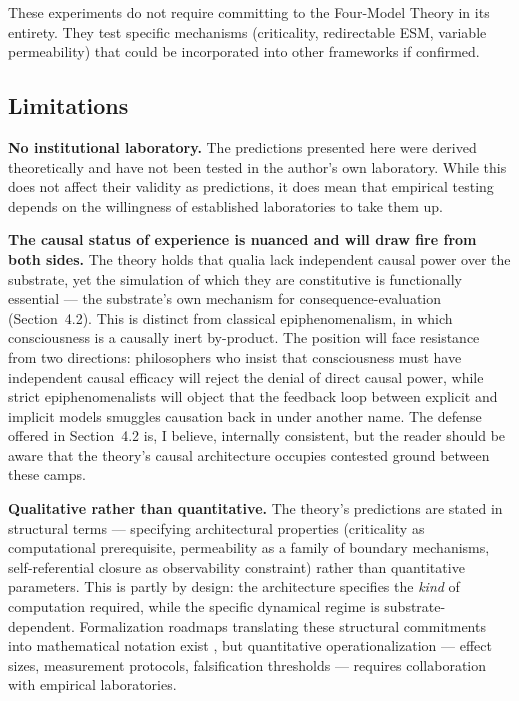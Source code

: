 \documentclass[12pt]{article}
\begin{document}
These experiments do not require committing to the Four-Model Theory in its entirety. They test specific mechanisms (criticality, redirectable ESM, variable permeability) that could be incorporated into other frameworks if confirmed.


\subsection{Limitations}


\textbf{No institutional laboratory.} The predictions presented here were derived theoretically and have not been tested in the author's own laboratory. While this does not affect their validity as predictions, it does mean that empirical testing depends on the willingness of established laboratories to take them up.

\textbf{The causal status of experience is nuanced and will draw fire from both sides.} The theory holds that qualia lack independent causal power over the substrate, yet the simulation of which they are constitutive is functionally essential --- the substrate's own mechanism for consequence-evaluation (Section~4.2). This is distinct from classical epiphenomenalism, in which consciousness is a causally inert by-product. The position will face resistance from two directions: philosophers who insist that consciousness must have independent causal efficacy will reject the denial of direct causal power, while strict epiphenomenalists will object that the feedback loop between explicit and implicit models smuggles causation back in under another name. The defense offered in Section~4.2 is, I believe, internally consistent, but the reader should be aware that the theory's causal architecture occupies contested ground between these camps.

\textbf{Qualitative rather than quantitative.} The theory's predictions are stated in structural terms --- specifying architectural properties (criticality as computational prerequisite, permeability as a family of boundary mechanisms, self-referential closure as observability constraint) rather than quantitative parameters. This is partly by design: the architecture specifies the \textit{kind} of computation required, while the specific dynamical regime is substrate-dependent. Formalization roadmaps translating these structural commitments into mathematical notation exist \citep{Gruber2026b}, but quantitative operationalization --- effect sizes, measurement protocols, falsification thresholds --- requires collaboration with empirical laboratories.
\end{document}
